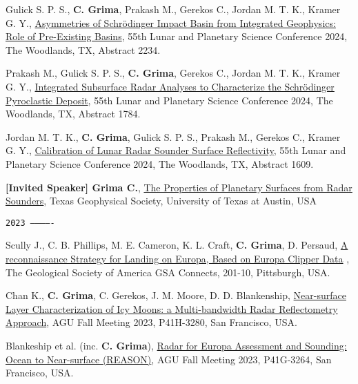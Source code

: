 \begin{etaremune}
\item
     Gulick S. P. S., \textbf{C. Grima}, Prakash M., Gerekos C., Jordan M. T. K., Kramer G. Y., \href{https://www.hou.usra.edu/meetings/lpsc2024/pdf/2234.pdf}{Asymmetries of Schrödinger Impact Basin from Integrated Geophysics: Role of Pre-Existing Basins}, 55th Lunar and Planetary Science Conference 2024, The Woodlands, TX, Abstract 2234.

\item
     Prakash M., Gulick S. P. S., \textbf{C. Grima}, Gerekos C., Jordan M. T. K., Kramer G. Y., \href{https://www.hou.usra.edu/meetings/lpsc2024/pdf/1784.pdf}{Integrated Subsurface Radar Analyses to Characterize the Schrödinger Pyroclastic Deposit}, 55th Lunar and Planetary Science Conference 2024, The Woodlands, TX, Abstract 1784.

\item
     Jordan M. T. K., \textbf{C. Grima}, Gulick S. P. S., Prakash M., Gerekos C., Kramer G. Y., \href{https://www.hou.usra.edu/meetings/lpsc2024/pdf/1609.pdf}{Calibration of Lunar Radar Sounder Surface Reflectivity}, 55th Lunar and Planetary Science Conference 2024, The Woodlands, TX, Abstract 1609.

\item
    \textbf{[Invited Speaker] Grima C.}, \href{}{The Properties of Planetary Surfaces from Radar Sounders}, Texas Geophysical Society, University of Texas at Austin, USA

\hspace{-2em}\texttt{2023 -------------}

\item
    Scully J., C. B. Phillips, M. E. Cameron, K. L. Craft, \textbf{C. Grima}, D. Persaud, \href{https://gsa.confex.com/gsa/2023AM/meetingapp.cgi/Paper/393517}{A reconnaissance Strategy for Landing on Europa, Based on Europa Clipper Data} , The Geological Society of America GSA Connects, 201-10, Pittsburgh, USA.

\item
   Chan K., \textbf{C. Grima}, C. Gerekos, J. M. Moore, D. D. Blankenship,  \href{https://agu.confex.com/agu/fm23/meetingapp.cgi/Paper/1404410}{Near-surface Layer Characterization of Icy Moons: a Multi-bandwidth Radar Reflectometry Approach}, AGU Fall Meeting 2023, P41H-3280, San Francisco, USA.

\item
   Blankeship et al. (inc. \textbf{C. Grima}), \href{https://agu.confex.com/agu/fm23/meetingapp.cgi/Paper/1434939}{Radar for Europa Assessment and Sounding: Ocean to Near-surface (REASON)}, AGU Fall Meeting 2023, P41G-3264, San Francisco, USA.


\end{etaremune}

